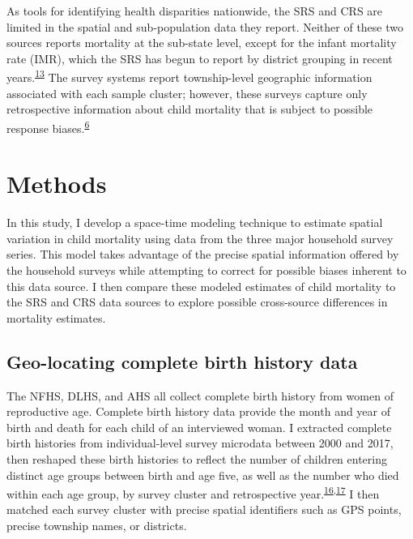 \documentclass[
]{article}
\begin{document}
As tools for identifying health disparities nationwide, the SRS and CRS are limited in the spatial and sub-population data they report. Neither of these two sources reports mortality at the sub-state level, except for the infant mortality rate (IMR), which the SRS has begun to report by district grouping in recent years.\textsuperscript{\protect\hyperlink{ref-Mahapatra2010}{13}} The survey systems report township-level geographic information associated with each sample cluster; however, these surveys capture only retrospective information about child mortality that is subject to possible response biases.\textsuperscript{\protect\hyperlink{ref-Dandona2016}{6}}

\hypertarget{methods}{%
\section{Methods}\label{methods}}

In this study, I develop a space-time modeling technique to estimate spatial variation in child mortality using data from the three major household survey series. This model takes advantage of the precise spatial information offered by the household surveys while attempting to correct for possible biases inherent to this data source. I then compare these modeled estimates of child mortality to the SRS and CRS data sources to explore possible cross-source differences in mortality estimates.

\hypertarget{geo-locating-complete-birth-history-data}{%
\subsection{Geo-locating complete birth history data}\label{geo-locating-complete-birth-history-data}}

The NFHS, DLHS, and AHS all collect complete birth history from women of reproductive age. Complete birth history data provide the month and year of birth and death for each child of an interviewed woman. I extracted complete birth histories from individual-level survey microdata between 2000 and 2017, then reshaped these birth histories to reflect the number of children entering distinct age groups between birth and age five, as well as the number who died within each age group, by survey cluster and retrospective year.\textsuperscript{\protect\hyperlink{ref-Burstein2019}{16},\protect\hyperlink{ref-Ahmad2000}{17}} I then matched each survey cluster with precise spatial identifiers such as GPS points, precise township names, or districts.
\end{document}
